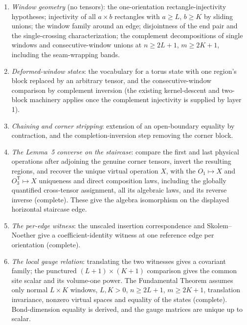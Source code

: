 \documentclass{article}
\begin{document}
\begin{enumerate}
    \item \emph{Window geometry} (no tensors): the one-orientation
          rectangle-injectivity hypotheses; injectivity of all
          $a \times b$ rectangles with $a \geq L$, $b \geq K$ by sliding
          unions; the window family around an edge; disjointness of the end
          pair and the single-crossing characterization; the complement
          decompositions of single windows and consecutive-window unions at
          $n \geq 2L+1$, $m \geq 2K+1$, including the seam-wrapping bands.
    \item \emph{Deformed-window states}: the vocabulary for a torus state
          with one region's block replaced by an arbitrary tensor, and the
          consecutive-window comparison by complement inversion (the existing
          kernel-descent and two-block machinery applies once the complement
          injectivity is supplied by layer 1).
    \item \emph{Chaining and corner stripping}: extension of an
          open-boundary equality by contraction, and the completion-inversion
          step removing the corner block.
    \item \emph{The Lemma~5 converse on the staircase}: compare the first and
          last physical operations after adjoining the genuine corner tensors,
          invert the resulting regions, and recover the unique virtual operation
          $X$, with the $O_1\mapsto X$ and $O_3^{\mathsf T}\mapsto X$ uniqueness and
          direct composition laws, including the globally quantified
          cross-tensor assignment, all its algebraic laws, and its reverse
          inverse (complete). These give the algebra isomorphism on the
          displayed horizontal staircase edge.
    \item \emph{The per-edge witness}: the unscaled insertion correspondence
          and Skolem--Noether give a coefficient-identity witness at one
          reference edge per orientation (complete).
    \item \emph{The local gauge relation}: translating the two witnesses gives
          a covariant family; the punctured $(L+1)\times(K+1)$ comparison
          gives the common site scalar and its volume-one power. The
          Fundamental Theorem assumes only normal $L\times K$ windows,
          $L,K>0$, $n\geq2L+1$, $m\geq2K+1$, translation invariance,
          nonzero virtual spaces and equality of the states (complete).
          Bond-dimension equality is derived, and the gauge matrices are
          unique up to scalar.
\end{enumerate}
\end{document}
